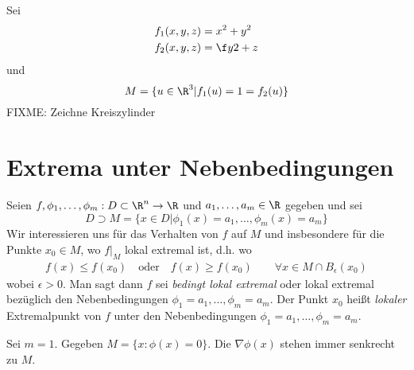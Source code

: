 \documentclass{mycourse}
\begin{document}
\begin{ex*}
	Sei
	\begin{align*}
		f_1(x,y,z) &= x^2 +y^2\\
		f_2(x,y,z) &= \f y2 + z
	\end{align*}
	und
	\[
		M=\{ u\in\R^3 | f_1(u) = 1 = f_2(u)\}
	\]
	FIXME: Zeichne Kreiszylinder
\end{ex*}


\section{Extrema unter Nebenbedingungen}


Seien $f,\phi_1,\dotsc, \phi_m : D\subset \R^n \to \R$ und $a_1,\dotsc,a_m\in \R$ gegeben und sei
\[
	D \supset M = \{x\in D| \phi_1(x) = a_1, \dotsc, \phi_m(x) = a_m\}
\]
Wir interessieren uns für das Verhalten von $f$ auf $M$ und insbesondere für die Punkte $x_0\in M$, wo $f\big|_M$ lokal extremal ist, d.h. wo
\begin{align*}
	f(x) \le f(x_0)\quad \text{oder}\quad f(x) \ge f(x_0)\qquad \forall x\in M\cap B_\epsilon(x_0)
\end{align*}
wobei $\epsilon > 0$.
Man sagt dann $f$ sei \emph{bedingt lokal extremal} oder lokal extremal bezüglich den Nebenbedingungen $\phi_1 = a_1, \dotsc, \phi_m=a_m$.
Der Punkt $x_0$ heißt \emph{lokaler} Extremalpunkt von $f$ unter den Nebenbedingungen $\phi_1=a_1,\dotsc, \phi_m=a_m$.

\begin{ex*}
	Sei $m=1$.
	Gegeben $M = \{x:\phi(x)=0\}$.
	Die $\nabla \phi(x)$ stehen immer senkrecht zu $M$.
	\fixme
\end{ex*}
\end{document}
